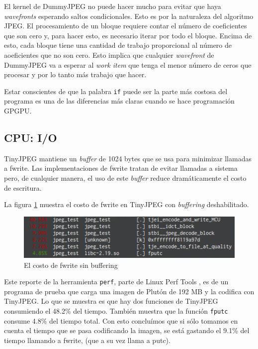{El kernel de DummyJPEG no puede hacer mucho para evitar que haya \emph{wavefronts}
esperando saltos condicionales. Esto es por la naturaleza del algoritmo JPEG.
El procesamiento de un bloque requiere contar el número de coeficientes que son
cero y, para hacer esto, es necesario iterar por todo el bloque. Encima de esto,
cada bloque tiene una cantidad de trabajo proporcional al número de
aoeficientes que no son cero. Esto implica que cualquier \emph{wavefront} de DummyJPEG
va a esperar al \emph{work item} que tenga el menor número de ceros que procesar y por
lo tanto más trabajo que hacer.

Estar conscientes de que la palabra \verb+if+ puede ser la parte más costosa
del programa es una de las diferencias más claras cuando se hace programación
\gls{GPGPU}.


\subsection{CPU: I/O} \label{sub:cpu-io}

TinyJPEG mantiene un \emph{buffer} de 1024 bytes que se usa para minimizar
llamadas a fwrite. Las implementaciones de fwrite tratan de evitar llamadas a
sistema pero, de cualquier manera, el uso de este \emph{ buffer } reduce dramáticamente
el costo de escritura.

La figura \ref{fig:fwrite} muestra el costo de fwrite en TinyJPEG con \emph{buffering}
deshabilitado.

\begin{figure}[hb]
    \includegraphics[width=5.16666in]{fputc}
    \caption{El costo de fwrite sin buffering}
    \label{fig:fwrite}
\end{figure}

Este reporte de la herramienta \verb+perf+, parte de Linux Perf Tools
\cite{linux-perf-tools}, es de un programa de prueba que carga una imagen de
Plutón de 192 MB y la codifica con TinyJPEG. Lo que se muestra es que hay dos
funciones de TinyJPEG consumiendo el 48.2\% del tiempo. También muestra que la
función \verb+fputc+ consume 4.8\% del tiempo total. Con esto concluímos que si
sólo tomamos en cuenta el tiempo que se pasa codificando la imagen, se está
gastando el 9.1\% del tiempo llamando a fwrite, (que a su vez llama a putc).

}
